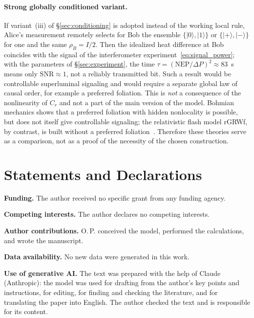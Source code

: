 \documentclass[11pt,a4paper]{article}
\newcommand{\Sref}[1]{\hyperref[#1]{\S\ref{#1}}}
\begin{document}
\paragraph{Strong globally conditioned variant.}
If variant~(iii) of \Sref{sec:conditioning} is adopted instead of the working local rule, Alice's measurement remotely selects for Bob the ensemble $\{|0\rangle,|1\rangle\}$ or $\{|+\rangle,|-\rangle\}$ for one and the same $\rho_B=I/2$. Then the idealized heat difference at Bob coincides with the signal of the interferometer experiment~\eqref{eq:signal_power}; with the parameters of \Sref{sec:experiment}, the time $\tau=(\mathrm{NEP}/\Delta P)^2\approx83$~s means only $\mathrm{SNR}\approx1$, not a reliably transmitted bit. Such a result would be controllable superluminal signaling and would require a separate global law of causal order, for example a preferred foliation. This is \emph{not} a consequence of the nonlinearity of $C_r$ and not a part of the main version of the model. Bohmian mechanics shows that a preferred foliation with hidden nonlocality is possible, but does not itself give controllable signaling; the relativistic flash model rGRWf, by contrast, is built without a preferred foliation~\cite{bohm1952,tumulka2006}. Therefore these theories serve as a comparison, not as a proof of the necessity of the chosen construction.

\section*{Statements and Declarations}

\noindent\textbf{Funding.} The author received no specific grant from any funding agency.

\noindent\textbf{Competing interests.} The author declares no competing interests.

\noindent\textbf{Author contributions.} O.\,P. conceived the model, performed the calculations, and wrote the manuscript.

\noindent\textbf{Data availability.} No new data were generated in this work.

\noindent\textbf{Use of generative AI.} The text was prepared with the help of Claude (Anthropic): the model was used for drafting from the author's key points and instructions, for editing, for finding and checking the literature, and for translating the paper into English. The author checked the text and is responsible for its content.



\end{document}
